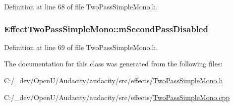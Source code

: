 Definition at line 68 of file Two\+Pass\+Simple\+Mono.\+h.

\subsubsection[{\texorpdfstring{m\+Second\+Pass\+Disabled}{mSecondPassDisabled}}]{ Effect\+Two\+Pass\+Simple\+Mono\+::m\+Second\+Pass\+Disabled\hspace{0.3cm}{\ttfamily [protected]}}\hypertarget{class_effect_two_pass_simple_mono_a8e8f6872ffef564a7d58d979b96e73cf}{}\label{class_effect_two_pass_simple_mono_a8e8f6872ffef564a7d58d979b96e73cf}


Definition at line 69 of file Two\+Pass\+Simple\+Mono.\+h.



The documentation for this class was generated from the following files\+:\begin{DoxyCompactItemize}
\item 
C\+:/\+\_\+dev/\+Open\+U/\+Audacity/audacity/src/effects/\hyperlink{_two_pass_simple_mono_8h}{Two\+Pass\+Simple\+Mono.\+h}\item 
C\+:/\+\_\+dev/\+Open\+U/\+Audacity/audacity/src/effects/\hyperlink{_two_pass_simple_mono_8cpp}{Two\+Pass\+Simple\+Mono.\+cpp}\end{DoxyCompactItemize}
